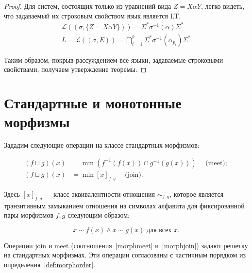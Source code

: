\documentclass[fontsize=14pt]{scrartcl}
\newcommand{\Lang}{\mathcal{L}}
\begin{document}
\begin{proof}
    Для систем, состоящих только из уравнений вида $Z = X \alpha Y$, легко видеть, что задаваемый их строковым свойством язык является LT.
    \begin{align*}
    \Lang((\sigma, \{Z = X \alpha Y\})) = \Sigma^* \sigma^{-1}(\alpha) \Sigma^* \\
    L = \Lang((\sigma, E)) =  \bigcap_{i=1}^k \Sigma^* \sigma^{-1}(\alpha_{p_i}) \Sigma^* 
    \end{align*}
    
    Таким образом, покрыв рассуждением все языки, задаваемые строковыми свойствами, получаем утверждение теоремы.

\end{proof}



\section{Стандартные и монотонные морфизмы}

Зададим следующие операции на классе стандартных морфизмов:

\begin{align}
    \label{morphmeet}
    (f \sqcap g)(x) &= \min(f^{-1}(f(x)) \cap g^{-1}(g(x))) \quad \text{ (meet)}; \\
    \label{morphjoin}
    (f \sqcup g)(x) &= \min [x]_{f,g} \quad \text{ (join)}.
\end{align}

Здесь $[x]_{f,g}$ --- класс эквивалентности отношения $\sim_{f, g}$, которое является транзитивным замыканием отношения на символах алфавита 
для фиксированной пары морфизмов $f, g$ следующим образом:

\begin{equation}
x \sim f(x) \wedge x \sim g(x) \text{ для всех } x.
\end{equation}

\begin{Proposition}
Операции join и meet (соотношения~\ref{morphmeet} и~\ref{morphjoin}) задают решетку на стандартных морфизмах.
Эти операции согласованы с частичным порядком из определения~\ref{def:morphorder}.
\end{Proposition}
\end{document}
